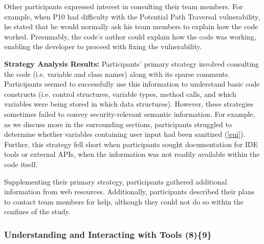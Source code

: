 \documentclass[10pt,journal,compsoc]{IEEEtran}
\begin{document}
Other participants expressed interest in consulting their team members. 
For example, when P10 had difficulty with the Potential Path Traversal vulnerability, he stated that he would normally ask his team members to explain how the code worked.
Presumably, the code's author could explain how the code was working, enabling the developer to proceed with fixing the vulnerability.


\textbf{Strategy Analysis Results:}
Participants' primary strategy involved consulting the code (i.e. variable and class names) along with its sparse comments.
Participants seemed to successfully use this information to understand basic code constructs (i.e. control structures, variable types, method calls, and which variables were being stored in which data structures).
However, these strategies sometimes failed to convey security-relevant semantic information. 
For example, as we discuss more in the surrounding sections, participants struggled to determine whether variables containing user input had been sanitized (\ref{eui}). 
Further, this strategy fell short when participants sought documentation for IDE tools or external APIs, when the information was not readily available within the code itself. 

Supplementing their primary strategy, participants gathered additional information from web resources.
Additionally, participants described their plans to contact team members for help, although they could not do so within the confines of the study.




\subsubsection{Understanding and Interacting with Tools (8)\{9\}}
\end{document}
